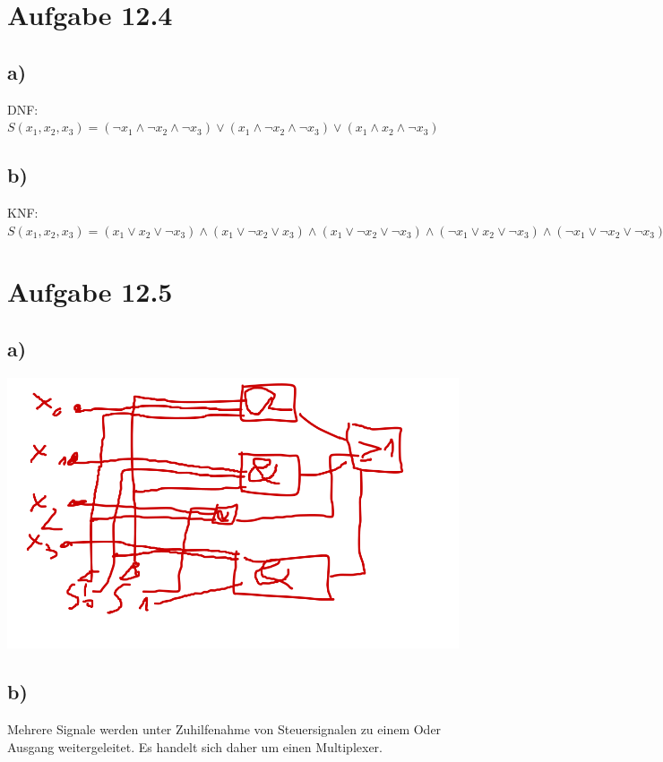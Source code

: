 \documentclass{article}
\begin{document}
	\section*{Aufgabe 12.4}
	\subsection*{a)}
	DNF: $S(x_1, x_2, x_3) = (\neg x_1 \land \neg x_2 \land \neg x_3) \lor (x_1 \land \neg x_2 \land \neg x_3) \lor (x_1 \land x_2 \land \neg x_3)$
	\subsection*{b)}
	KNF: $S(x_1, x_2, x_3) = (x_1 \lor x_2 \lor \neg x_3) \land (x_1 \lor \neg x_2 \lor x_3) \land (x_1 \lor \neg x_2 \lor \neg x_3) \land (\neg x_1 \lor x_2 \lor \neg x_3) \land (\neg x_1 \lor \neg x_2 \lor \neg x_3) $
	\section*{Aufgabe 12.5}
	\subsection*{a)}
	\includegraphics[width=\linewidth]{125a}
	\subsection*{b)}
	Mehrere Signale werden unter Zuhilfenahme von Steuersignalen zu einem Oder Ausgang weitergeleitet. Es handelt sich daher um einen Multiplexer.
\end{document}
